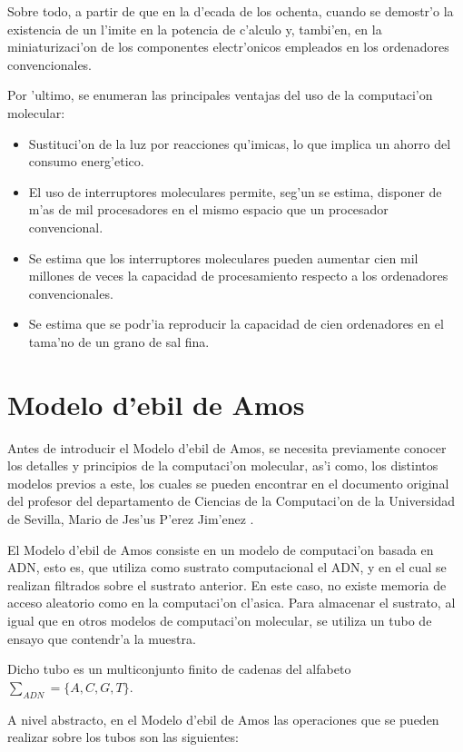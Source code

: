 \documentclass[12pt]{article}
\begin{document}
Sobre todo, a partir de que en la d'ecada de los ochenta, cuando se demostr'o la existencia de un l'imite en la potencia
de c'alculo y, tambi'en, en la miniaturizaci'on de los componentes electr'onicos empleados en los ordenadores convencionales.

Por 'ultimo, se enumeran las principales ventajas del uso de la computaci'on molecular:

\begin{itemize}
	\item Sustituci'on de la luz por reacciones qu'imicas, lo que implica un ahorro del consumo energ'etico.
	\item El uso de interruptores moleculares permite, seg'un se estima, disponer de m'as de mil procesadores
    en el mismo espacio que un procesador convencional.
	\item Se estima que los interruptores moleculares pueden aumentar cien mil millones de veces la capacidad
    de procesamiento respecto a los ordenadores convencionales.
	\item Se estima que se podr'ia reproducir la capacidad de cien ordenadores en el tama'no de un grano de sal fina.
\end{itemize}

\section{Modelo d'ebil de Amos}

Antes de introducir el Modelo d'ebil de Amos, se necesita previamente conocer los detalles y principios
de la computaci'on molecular, as'i como, los distintos modelos previos a este, los cuales se pueden encontrar
en el documento original del profesor del departamento de Ciencias de la Computaci'on de la Universidad
de Sevilla, Mario de Jes'us P'erez Jim'enez \cite{Mario-deJesus}.

El Modelo d'ebil de Amos consiste en un modelo de computaci'on basada en ADN, esto es, que utiliza como sustrato
computacional el ADN, y en el cual se realizan filtrados sobre el sustrato anterior. En este caso, no existe
memoria de acceso aleatorio como en la computaci'on cl'asica. Para almacenar el sustrato, al igual que en otros
modelos de computaci'on molecular, se utiliza un tubo de ensayo que contendr'a la muestra.

Dicho tubo es un multiconjunto finito de cadenas del alfabeto $\sum_{ADN} = \{A, C, G, T\}$.

A nivel abstracto, en el Modelo d'ebil de Amos las operaciones que se pueden realizar sobre los tubos
son las siguientes:
\end{document}
